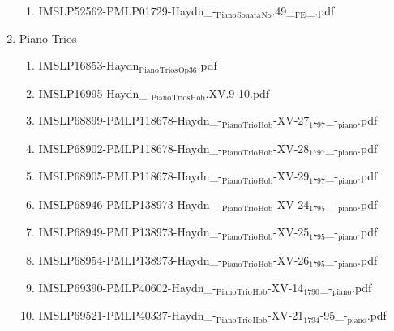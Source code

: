 \documentclass[11pt]{article}
\begin{document}
\begin{enumerate}
\begin{enumerate}
\item IMSLP52562-PMLP01729-Haydn\_-$_{\text{Piano}}$$_{\text{Sonata}}$$_{\text{No}}$.49\_$_{\text{FE}}$\_.pdf
\label{sec-1-1-1-1-44-38-4-52}
\end{enumerate}

\item Piano Trios
\label{sec-1-1-1-1-44-38-5}
\begin{enumerate}
\item IMSLP16853-Haydn$_{\text{Piano}}$$_{\text{Trios}}$$_{\text{Op36}}$.pdf
\label{sec-1-1-1-1-44-38-5-1}

\item IMSLP16995-Haydn\_-$_{\text{Piano}}$$_{\text{Trios}}$$_{\text{Hob}}$.XV.9-10.pdf
\label{sec-1-1-1-1-44-38-5-2}

\item IMSLP68899-PMLP118678-Haydn\_-$_{\text{Piano}}$$_{\text{Trio}}$$_{\text{Hob}}$-XV-27$_{\text{1797}}$\_-$_{\text{piano}}$.pdf
\label{sec-1-1-1-1-44-38-5-3}

\item IMSLP68902-PMLP118678-Haydn\_-$_{\text{Piano}}$$_{\text{Trio}}$$_{\text{Hob}}$-XV-28$_{\text{1797}}$\_-$_{\text{piano}}$.pdf
\label{sec-1-1-1-1-44-38-5-4}

\item IMSLP68905-PMLP118678-Haydn\_-$_{\text{Piano}}$$_{\text{Trio}}$$_{\text{Hob}}$-XV-29$_{\text{1797}}$\_-$_{\text{piano}}$.pdf
\label{sec-1-1-1-1-44-38-5-5}

\item IMSLP68946-PMLP138973-Haydn\_-$_{\text{Piano}}$$_{\text{Trio}}$$_{\text{Hob}}$-XV-24$_{\text{1795}}$\_-$_{\text{piano}}$.pdf
\label{sec-1-1-1-1-44-38-5-6}

\item IMSLP68949-PMLP138973-Haydn\_-$_{\text{Piano}}$$_{\text{Trio}}$$_{\text{Hob}}$-XV-25$_{\text{1795}}$\_-$_{\text{piano}}$.pdf
\label{sec-1-1-1-1-44-38-5-7}

\item IMSLP68954-PMLP138973-Haydn\_-$_{\text{Piano}}$$_{\text{Trio}}$$_{\text{Hob}}$-XV-26$_{\text{1795}}$\_-$_{\text{piano}}$.pdf
\label{sec-1-1-1-1-44-38-5-8}

\item IMSLP69390-PMLP40602-Haydn\_-$_{\text{Piano}}$$_{\text{Trio}}$$_{\text{Hob}}$-XV-14$_{\text{1790}}$\_-$_{\text{piano}}$.pdf
\label{sec-1-1-1-1-44-38-5-9}

\item IMSLP69521-PMLP40337-Haydn\_-$_{\text{Piano}}$$_{\text{Trio}}$$_{\text{Hob}}$-XV-21$_{\text{1794}}$-95\_-$_{\text{piano}}$.pdf
\label{sec-1-1-1-1-44-38-5-10}


\end{enumerate}
\end{enumerate}
\end{document}
